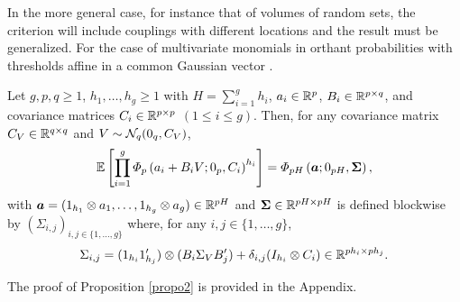 \documentclass[aoas]{imsart}
\begin{document}
In the more general case, for instance that of volumes of random sets,
the criterion will include couplings with different locations and the
result must be generalized. For the case of multivariate monomials in
orthant probabilities with thresholds affine in a common Gaussian
vector .

\begin{propo}%
	\label{propo3}
	Let $g, p, q\geq 1$, $h_{1},\dots, h_{g}\geq 1$ with $H=\sum_{i=1}^g h_i$, $a_{i} \in \mathbb{R}^{p}$, $B_{i}\in \mathbb{R}^{p \times q}$, and covariance matrices $C_i \in \mathbb{R}^{p \times p}$ $(1\leq i \leq g)$. Then, for any covariance matrix $C_{V} \in \mathbb{R}^{q\times q}$ and $V\sim\mathcal{N}_{q}(0_q,C_{V})$, 
	\begin{equation}
	\mathbb{E}\left[ \prod_{i=1}^{g} \varPhi_{p}\left(a_i + B_{i}V;0_p, \covN_{i} \right)^{h_i} \right]
	=
	\varPhi_{p H}
	\left(
	\bm{a}
	;0_{pH},
	\mathbf{\Sigma}
	\right),
	\end{equation}
	with $\bm{a}=(1_{h_1}\otimes a_1, \dots, 1_{h_g}\otimes a_{g}) \in \mathbb{R}^{p H}$
	and $\mathbf{\Sigma}\in \mathbb{R}^{p H \times p H}$ is defined blockwise by $(\Sigma_{i,j})_{i,j \in \{1,\dots, g\}}$ where, for any $i,j \in \{1,\dots, g\}$, %
	\begin{equation}
	\Sigma_{i,j}=
	(1_{h_{i}}1_{h_{j}}')\otimes (B_{i}\Sigma_{V} B_{j}') + \delta_{i,j}(I_{h_{i}}\otimes \covN_{i}) \in \R^{p h_{i} \times p h_{j}}.
	\end{equation}
\end{propo}
The proof of Proposition \ref{propo2} is provided in the Appendix. 
\end{document}
